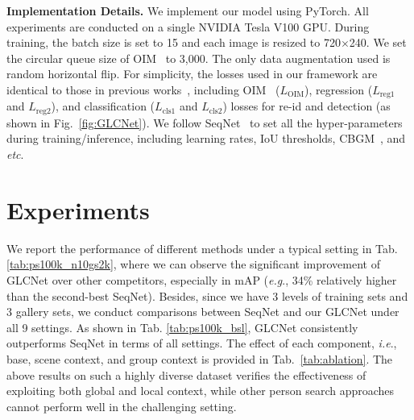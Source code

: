 \documentclass{article}
\def\eg{\emph{e.g}.} \def\Eg{\emph{E.g}.}
\def\ie{\emph{i.e}.} \def\Ie{\emph{I.e}.}
\def\etc{\emph{etc}.} \def\vs{\emph{vs}.}
\def\ourmodel{GLCNet}
\newcommand{\figref}[1]{Fig.~\ref{#1}}
\newcommand{\tabref}[1]{Tab.~\ref{#1}}
\begin{document}
\textbf{Implementation Details.} We implement our model using PyTorch. All experiments are conducted on a single NVIDIA Tesla V100 GPU. During training, the batch size is set to 15 and each image is resized to 720$\times$240. We set the circular queue size of OIM~\cite{OIM} to 3,000. The only data augmentation used is random horizontal flip. For simplicity, the losses used in our framework are identical to those in previous works~\cite{OIM,SeqNet,NAE}, including OIM~\cite{OIM} ($L_{\mathrm{OIM}}$), regression ($L_{\mathrm{reg1}}$ and $L_{\mathrm{reg2}}$), and classification ($L_{\mathrm{cls1}}$ and $L_{\mathrm{cls2}}$) losses for re-id and detection (as shown in \figref{fig:GLCNet}). We follow SeqNet~\cite{SeqNet} to set all the hyper-parameters during training/inference, including learning rates, IoU thresholds, CBGM~\cite{SeqNet}, and \etc{}




\section{Experiments}
\label{sec:exp}
We report the performance of different methods under a typical setting in Tab. \ref{tab:ps100k_n10gs2k}, where we can observe the significant improvement of \ourmodel{} over other competitors, especially in mAP (\eg, 34\% relatively higher than the second-best SeqNet). Besides, since we have 3 levels of training sets and 3 gallery sets, we conduct comparisons between SeqNet and our \ourmodel{} under all 9 settings. As shown in Tab. \ref{tab:ps100k_bsl}, \ourmodel{} consistently outperforms SeqNet in terms of all settings. The effect of each component, \ie{}, base, scene context, and group context is provided in \tabref{tab:ablation}.
The above results on such a highly diverse dataset verifies the effectiveness of exploiting both global and local context, while other person search approaches cannot perform well in the challenging setting.
\end{document}
